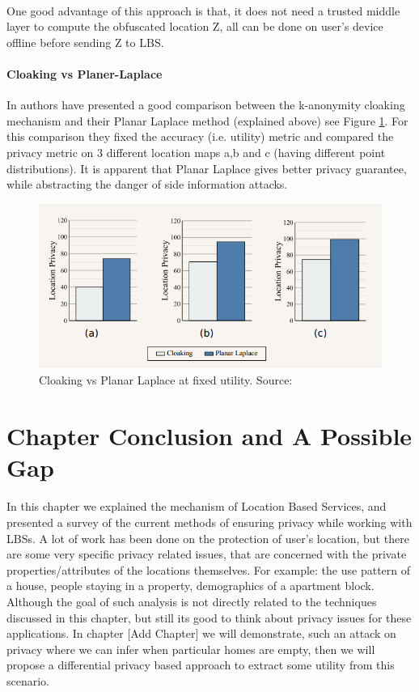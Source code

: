 \documentclass[12pt]{report}
\theoremstyle{named}
\begin{document}
\paragraph{}
One good advantage of this approach is that, it does not need a trusted middle layer to compute the obfuscated location Z, all can be done on user's device offline before sending Z to LBS.
\paragraph{Cloaking vs Planer-Laplace}
In \cite{andres2013geo} authors have presented a good comparison between the k-anonymity cloaking mechanism and their Planar Laplace method (explained above) see Figure \ref{fig:CloakingVsPlanar}. For this comparison they fixed the accuracy (i.e. utility) metric and compared the privacy metric on 3 different location maps a,b and c (having different point distributions). It is apparent that Planar Laplace gives better privacy guarantee, while abstracting the danger of side information attacks.

\begin{figure}[ht]
\centering
        \includegraphics[width=120mm,scale=1]{Images/CloakingVsLaplace.PNG}
    \caption{Cloaking vs Planar Laplace at fixed utility. Source:\cite{andres2013geo}}
    \label{fig:CloakingVsPlanar}
\end{figure}


\section{Chapter Conclusion and A Possible Gap}
\paragraph{}
In this chapter we explained the mechanism of Location Based Services, and presented a survey of the current methods of ensuring privacy while working with LBSs. A lot of work has been done on the protection of user's location, but there are some very specific privacy related issues, that are concerned with the private properties/attributes of the locations themselves. For example: the use pattern of a house, people staying in a property, demographics of a apartment block. Although the goal of such analysis is not directly related to the techniques discussed in this chapter, but still its good to think about privacy issues for these applications. In chapter [Add Chapter] we will demonstrate, such an attack on privacy where we can infer when particular homes are empty, then we will propose a differential privacy based approach to extract some utility from this scenario.
\end{document}
